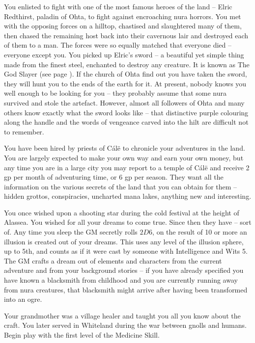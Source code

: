 \begin{multicols}{2}
\begin{list}{\addtocounter{list}{1}\textbf{:}}{\raggedleft}
\item{You enlisted to fight with one of the most famous heroes of the land -- Elric Redthirst, paladin of Ohta, to fight against encroaching nura horrors.
You met with the opposing forces on a hilltop, chastised and slaughtered many of them, then chased the remaining host back into their cavernous lair and destroyed each of them to a man.
The forces were so equally matched that everyone died -- everyone except you.
You picked up Elric's sword -- a beautiful yet simple thing made from the finest steel, enchanted to destroy any creature.
It is known as The God Slayer (see page \pageref{godslayer}).
If the church of Ohta find out you have taken the sword, they will hunt you to the ends of the earth for it.
At present, nobody knows you well enough to be looking for you -- they probably assume that some nura survived and stole the artefact.
However, almost all followers of Ohta and many others know exactly what the sword looks like -- that distinctive purple colouring along the handle and the words of vengeance carved into the hilt are difficult not to remember.
}

\item{You have been hired by priests of C\'{a}l\"{e} to chronicle your adventures in the land.
You are largely expected to make your own way and earn your own money, but any time you are in a large city you may report to a temple of C\'{a}l\"{e} and receive 2 gp per month of adventuring time, or 6 gp per season.
They want all the information on the various secrets of the land that you can obtain for them -- hidden grottos, conspiracies, uncharted mana lakes, anything new and interesting.
}

\item{You once wished upon a shooting star during the cold festival at the height of Alassea.
You wished for all your dreams to come true.
Since then they have -- sort of.
Any time you sleep the GM secretly rolls $2D6$, on the result of 10 or more an illusion is created out of your dreams.
This uses any level of the illusion sphere, up to 5th, and counts as if it were cast by someone with Intelligence and Wits 5.
The GM crafts a dream out of elements and characters from the current adventure and from your background stories -- if you have already specified you have known a blacksmith from childhood and you are currently running away from nura creatures, that blacksmith might arrive after having been transformed into an ogre.
}

\item{Your grandmother was a village healer and taught you all you know about the craft. You later served in Whiteland during the war between gnolls and humans.  Begin play with the first level of the Medicine Skill.}


\end{list}
\end{multicols}
